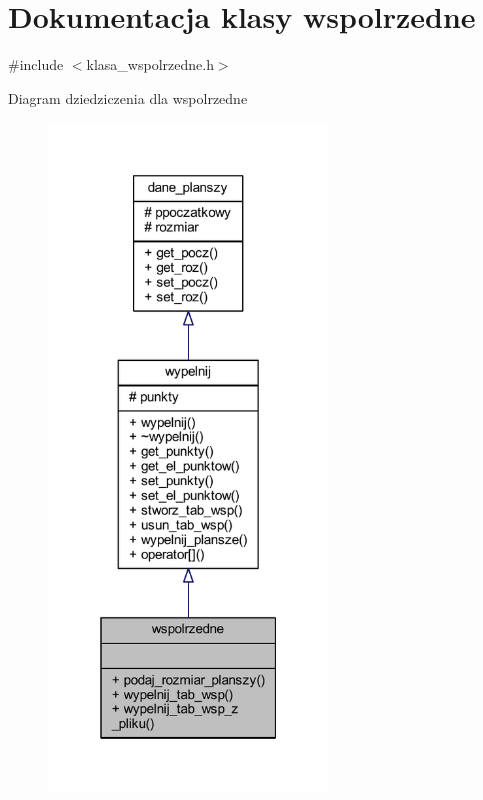 \hypertarget{classwspolrzedne}{}\section{Dokumentacja klasy wspolrzedne}
\label{classwspolrzedne}


{\ttfamily \#include $<$klasa\+\_\+wspolrzedne.\+h$>$}



Diagram dziedziczenia dla wspolrzedne
\nopagebreak
\begin{figure}[H]
\begin{center}
\leavevmode
\includegraphics[width=211pt]{classwspolrzedne__inherit__graph}
\end{center}
\end{figure}



